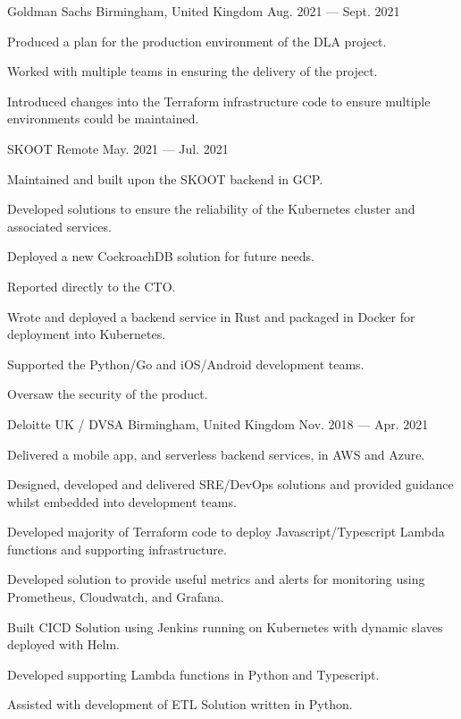 \begin{cventries}
    {Goldman Sachs}
    {Birmingham, United Kingdom}
    {Aug. 2021 — Sept. 2021}
    {
        \begin{cvitems}
        \item{Produced a plan for the production environment of the DLA project.}
        \item{Worked with multiple teams in ensuring the delivery of the project.}
        \item{Introduced changes into the Terraform infrastructure code to ensure multiple environments could be maintained.}
        \end{cvitems}
    }

    {SKOOT}
    {Remote}
    {May. 2021 — Jul. 2021}
    {
        \begin{cvitems}
        \item{Maintained and built upon the SKOOT backend in GCP.}
        \item{Developed solutions to ensure the reliability of the Kubernetes cluster and associated services.}
        \item{Deployed a new CockroachDB solution for future needs.}
        \item{Reported directly to the CTO.}
        \item{Wrote and deployed a backend service in Rust and packaged in Docker for deployment into Kubernetes.}
        \item{Supported the Python/Go and iOS/Android development teams.}
        \item{Oversaw the security of the product.}
        \end{cvitems}
    }

    {Deloitte UK / DVSA}
    {Birmingham, United Kingdom}
    {Nov. 2018 — Apr. 2021}
    {
        \begin{cvitems}
        \item{Delivered a mobile app, and serverless backend services, in AWS and Azure.}
        \item{Designed, developed and delivered SRE/DevOps solutions and provided guidance whilst embedded into development teams.}
        \item{Developed majority of Terraform code to deploy Javascript/Typescript Lambda functions and supporting infrastructure.}
        \item{Developed solution to provide useful metrics and alerts for monitoring using Prometheus, Cloudwatch, and Grafana.}
        \item{Built CICD Solution using Jenkins running on Kubernetes with dynamic slaves deployed with Helm.}
        \item{Developed supporting Lambda functions in Python and Typescript.}
        \item{Assisted with development of ETL Solution written in Python.}
        \end{cvitems}
    }


\end{cventries}
